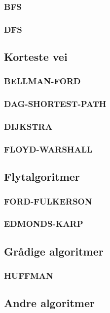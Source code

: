 \subsubsection{BFS}
\subsubsection{DFS}
\subsection{Korteste vei}
\subsubsection{BELLMAN-FORD}
\subsubsection{DAG-SHORTEST-PATH}
\subsubsection{DIJKSTRA}
\subsubsection{FLOYD-WARSHALL}
\subsection{Flytalgoritmer}
\subsubsection{FORD-FULKERSON}
\subsubsection{EDMONDS-KARP}
\subsection{Grådige algoritmer}
\subsubsection{HUFFMAN}
\subsection{Andre algoritmer}